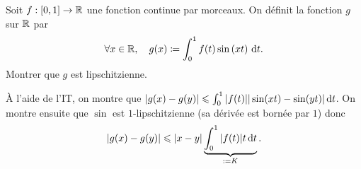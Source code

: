 \documentclass{magnolia}
\begin{document}
\begin{exoUnique}
\exo[utile=2] Soit $f:\left[0,1\right]\to\mathbb{R}$ une fonction continue par morceaux. On
  définit la fonction $g$ sur $\mathbb{R}$ par
  \[\forall x\in\mathbb{R} ,\quad g(x)\coloneqq\int_{0}^{1} f(t)\sin\left(xt\right)\,\text{d}t.\]
  Montrer que $g$ est lipschitzienne.
  \begin{sol}
  \`A l'aide de l'IT, on montre que $|g(x)-g(y)|\leqslant \int_{0}^{1} |f(t)||\sin(xt)-\sin(yt)|\,\text{d}t$. On montre ensuite que $\sin$ est $1$-lipschitzienne (sa dérivée est bornée par $1$) donc $$|g(x)-g(y)|\leqslant |x-y|\underbrace{\int_{0}^{1} |f(t)|t\,\text{d}t}_{:=K}.$$
  \end{sol}
\end{exoUnique}
\end{document}
